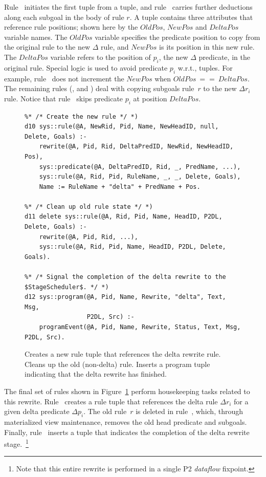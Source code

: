 Rule~ initiates the first  tuple from a 
tuple, and rule~ carries further  deductions along each
subgoal in the body of rule $r$.  A  tuple contains three
attributes that reference rule positions; shown here by the $OldPos$, $NewPos$
and $DeltaPos$ variable names.  The $OldPos$ variable specifies the predicate
position to copy from the original rule to the new $\Delta$ rule, and $NewPos$
is its position in this new rule.  The $DeltaPos$ variable refers to the
position of $p_i$, the new $\Delta$ predicate, in the original rule.  Special
logic is used to avoid predicate $p_i$ w.r.t.,  tuples.  For
example, rule~ does not increment the $NewPos$ when $OldPos\ ==\
DeltaPos$.  The remaining rules (,  and ) deal with
copying subgoals rule~$r$ to the new $\Delta r_i$ rule.  Notice that rule~
skips predicate $p_i$ at position $DeltaPos$.

\begin{figure}[!t]
\ssp
\centering
\begin{lstlisting}
%* /* Create the new rule */ *)
d10 sys::rule(@A, NewRid, Pid, Name, NewHeadID, null, Delete, Goals) :-
    rewrite(@A, Pid, Rid, DeltaPredID, NewRid, NewHeadID, Pos),
    sys::predicate(@A, DeltaPredID, Rid, _, PredName, ...),
    sys::rule(@A, Rid, Pid, RuleName, _, _, Delete, Goals),
    Name := RuleName + "delta" + PredName + Pos.

%* /* Clean up old rule state */ *)
d11 delete sys::rule(@A, Rid, Pid, Name, HeadID, P2DL, Delete, Goals) :-
    rewrite(@A, Pid, Rid, ...),
    sys::rule(@A, Rid, Pid, Name, HeadID, P2DL, Delete, Goals).
  
%* /* Signal the completion of the delta rewrite to the $StageScheduler$. */ *)
d12 sys::program(@A, Pid, Name, Rewrite, "delta", Text, Msg, 
                 P2DL, Src) :-
    programEvent(@A, Pid, Name, Rewrite, Status, Text, Msg, P2DL, Src).
\end{lstlisting}
\caption{\label{ch:evita:fig:delta4}Creates a new rule tuple that references the delta 
rewrite rule. Cleans up the old (non-delta) rule. Inserts a program tuple indicating
that the delta rewrite has finished. }
\end{figure}

The final set of rules shown in Figure~\ref{ch:evita:fig:delta4} perform
housekeeping tasks related to this rewrite.  Rule~\ol{d10} creates a rule tuple
that references the delta rule $\Delta r_i$ for a given delta predicate $\Delta
p_i$.  The old rule~$r$ is deleted in rule~\ol{d11}, which, through
materialized view maintenance, removes the old head predicate and subgoals.
Finally, rule~\ol{d12} inserts a \ol{program} tuple that indicates the
completion of the delta rewrite stage.~\footnote{Note that this entire rewrite
is performed in a single P2 {\em dataflow} fixpoint.}

